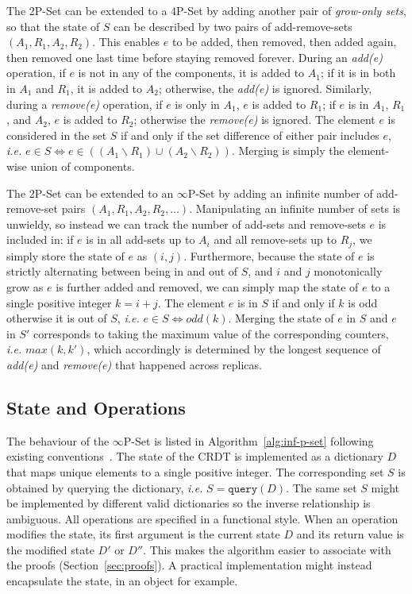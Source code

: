 \documentclass[9pt, oneside]{article}   	%
\begin{document}
The 2P-Set can be extended to a 4P-Set by adding another pair of \textit{grow-only sets}, so that the state of $S$ can be described by two pairs of add-remove-sets $(A_1,R_1,A_2,R_2)$.  This enables $e$ to be added, then removed, then added again, then removed one last time before staying removed forever. During an \textit{add(e)} operation, if $e$ is not in any of the components, it is added to $A_1$; if it is in both in $A_1$ and $R_1$, it is added to $A_2$; otherwise, the \textit{add(e)} is ignored. Similarly, during a \textit{remove(e)} operation, if $e$ is only in $A_1$, $e$ is added to $R_1$; if $e$ is in $A_1$, $R_1$, and $A_2$, $e$ is added to $R_2$; otherwise the \textit{remove(e)} is ignored. The element $e$ is considered in the set $S$ if and only if the set difference of either pair includes $e$, \textit{i.e.} $e \in S \Leftrightarrow e \in  ((A_1 \backslash R_1) \cup (A_2 \backslash R_2))$. Merging is simply the element-wise union of components.

The 2P-Set can be extended to an $\infty$P-Set by adding an infinite number of add-remove-set pairs $(A_1, R_1, A_2, R_2, \dots)$. Manipulating an infinite number of sets is unwieldy, so instead we can track the number of add-sets and remove-sets 
$e$ is included in: if $e$ is in all add-sets up to $A_i$ and all remove-sets up to $R_{j}$, we simply store the state of $e$ as $(i, j)$. Furthermore, because the state of $e$ is strictly alternating between being in and out of $S$, and $i$ and $j$ monotonically grow as $e$ is further added and removed, we can simply map the state of $e$ to a single positive integer $k=i+j$. The element $e$ is in $S$ if and only if $k$ is odd otherwise it is out of $S$, \textit{i.e.} $e \in S \Leftrightarrow odd(k)$. Merging the state of $e$ in $S$ and $e$ in $S'$ corresponds to taking the maximum value of the corresponding counters, \textit{i.e.} $\textit{max}(k, k')$, which accordingly is determined by the longest sequence of \textit{add(e)} and \textit{remove(e)} that happened across replicas. 

\subsection{State and Operations}
\label{sec:data-type}

The behaviour of the $\infty$P-Set is listed in Algorithm~\ref{alg:inf-p-set} following existing conventions~\cite{shapiro:inria-00555588}.  The state of the CRDT is implemented as a dictionary $D$ that 
maps unique elements to a single positive integer. The corresponding set $S$ is obtained by querying the dictionary, \textit{i.e.} $S=\texttt{query}(D)$. The same set $S$ might be implemented by different valid dictionaries so the inverse relationship is ambiguous. All operations are specified in a functional style. When an operation modifies the state, its first argument is the current state $D$ and its return value is the modified state $D'$ or $D''$. This makes the algorithm easier to associate with the proofs (Section~\ref{sec:proofs}). A practical implementation might instead encapsulate the state, in an object for example.
\end{document}

